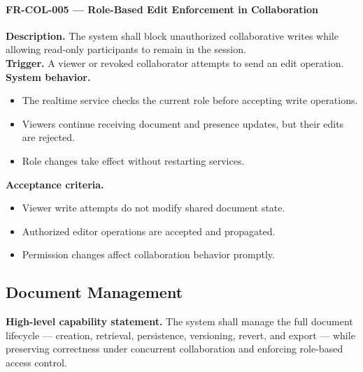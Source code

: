 \paragraph{FR-COL-005 --- Role-Based Edit Enforcement in Collaboration}
\textbf{Description.} The system shall block unauthorized collaborative writes while allowing read-only
participants to remain in the session.\\
\textbf{Trigger.} A viewer or revoked collaborator attempts to send an edit operation.\\
\textbf{System behavior.}
\begin{itemize}
  \item The realtime service checks the current role before accepting write operations.
  \item Viewers continue receiving document and presence updates, but their edits are rejected.
  \item Role changes take effect without restarting services.
\end{itemize}
\textbf{Acceptance criteria.}
\begin{itemize}
  \item Viewer write attempts do not modify shared document state.
  \item Authorized editor operations are accepted and propagated.
  \item Permission changes affect collaboration behavior promptly.
\end{itemize}

\subsection{Document Management}

\textbf{High-level capability statement.} The system shall manage the full document lifecycle ---
creation, retrieval, persistence, versioning, revert, and export --- while preserving correctness under
concurrent collaboration and enforcing role-based access control.


